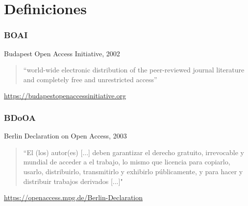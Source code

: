 \documentclass[17pt,aspectratio=169]{beamer}
\begin{document}
\section{Definiciones}


\begin{frame}
\frametitle{BOAI}

Budapest Open Access Initiative, 2002

\vspace{.5cm}

\begin{quote}
  ``world-wide electronic distribution of the peer-reviewed journal literature and completely free and unrestricted access''
\end{quote}

\begin{flushright}
  {\small \url{https://budapestopenaccessinitiative.org}}
\end{flushright}

\end{frame}


\begin{frame}
\frametitle{BDoOA}

Berlin Declaration on Open Access, 2003

\vspace{.3cm}

\begin{quote}
  ``El (los) autor(es) [...] deben garantizar el derecho gratuito, irrevocable y mundial de acceder a el trabajo, lo mismo que licencia para copiarlo, usarlo, distribuirlo, transmitirlo y exhibirlo públicamente, y para hacer y distribuir trabajos derivados [...]"
\end{quote}


\begin{flushright}
  {\small \url{https://openaccess.mpg.de/Berlin-Declaration}}
\end{flushright}

\end{frame}

\end{document}
